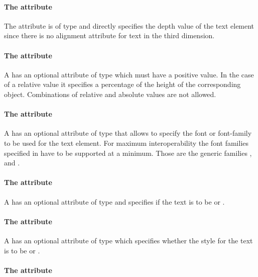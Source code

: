 \paragraph{The \fixttspace{} attribute}

The  attribute is of type
\RelAbsVector and directly specifies the depth value of the text element since 
there is no alignment attribute for text in the third dimension.

\paragraph{The \fixttspace{} attribute}

A \Text has an optional attribute  of type \RelAbsVector which 
must have a positive value. In the case of a relative value it specifies a 
percentage of the height of the corresponding object. Combinations of relative 
and absolute values are not allowed.


\paragraph{The \fixttspace{} attribute}

A \Text has an optional attribute  of type
 that allows to specify the font or font-family to be used for 
the text element. For maximum interoperability the font families specified in 
\FontFamily have to be supported at a minimum. Those are the generic families 
,  and .

\paragraph{The \fixttspace{} attribute}

A \Text has an optional attribute  of type
\FontWeight and specifies if the text is to be  or .

\paragraph{The \fixttspace{} attribute}

A \Text has an optional attribute  of type \FontStyle which 
specifies whether the style for the text is to be  or .

\paragraph{The \fixttspace{} attribute}

